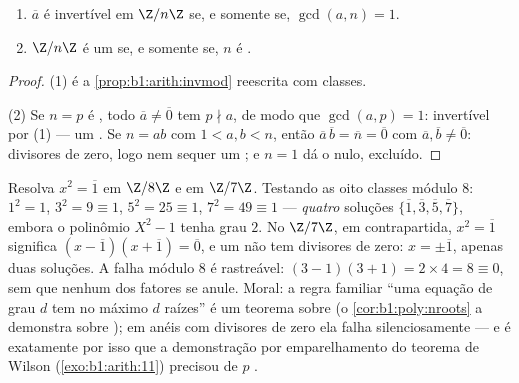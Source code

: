 \begin{theorem}\label{thm:b1:structures:zp}
\begin{enumerate}
  \item $\overline a$ é invertível em $\Z/n\Z$ se, e somente se,
        $\gcd(a, n) = 1$.
  \item $\Z/n\Z$ é um  se, e somente se, $n$ é .
\end{enumerate}
\end{theorem}

\begin{proof}
(1) é a \cref{prop:b1:arith:invmod} reescrita com classes.

(2) Se $n = p$ é , todo $\overline a \neq \overline 0$ tem $p
\nmid a$, de modo que $\gcd(a, p) = 1$: invertível por (1) --- um . Se $n =
ab$ com $1 < a, b < n$, então $\overline a\, \overline b = \overline
n = \overline 0$ com $\overline a, \overline b \neq \overline 0$:
divisores de zero, logo nem sequer um ; e $n = 1$
dá o  nulo, excluído.
\end{proof}

\begin{example}\label{ex:b1:structures:sqrtone}
Resolva $x^2 = \overline 1$ em $\Z/8\Z$ e em $\Z/7\Z$. Testando as
oito classes módulo $8$: $1^2 = 1$, $3^2 = 9 \equiv 1$, $5^2 = 25
\equiv 1$, $7^2 = 49 \equiv 1$ --- \emph{quatro} soluções
$\{\overline1, \overline3, \overline5, \overline7\}$, embora
o polinômio $X^2 - 1$ tenha grau $2$. No  $\Z/7\Z$,
em contrapartida, $x^2 = \overline1$ significa $(x - \overline1)(x +
\overline1) = \overline0$, e um  não tem divisores de zero: $x =
\pm\overline1$, apenas duas soluções. A falha módulo $8$ é
rastreável: $(3-1)(3+1) = 2 \times 4 = 8 \equiv 0$, sem que nenhum dos
fatores se anule. Moral: a regra familiar ``uma equação de grau $d$
tem no máximo $d$ raízes'' é um teorema sobre \emph{} (o \cref{cor:b1:poly:nroots} a demonstra sobre
); em anéis com divisores de zero ela falha silenciosamente --- e
é exatamente por isso que a demonstração por emparelhamento do teorema
de Wilson (\cref{exo:b1:arith:11}) precisou de $p$ .
\end{example}

